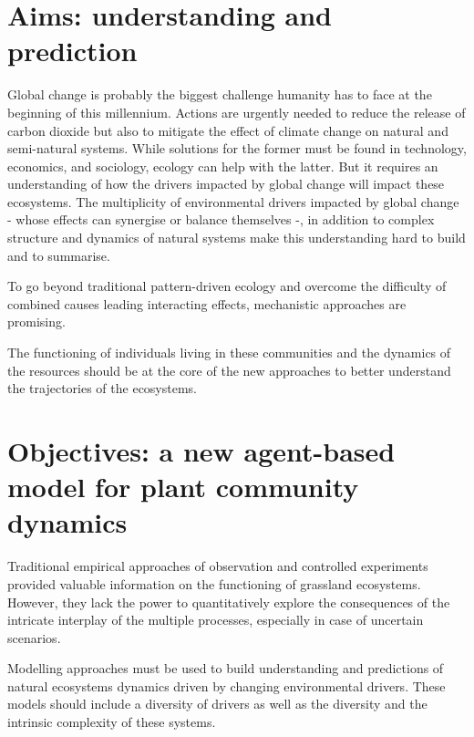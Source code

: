 \section{Aims: understanding and prediction}

Global change is probably the biggest challenge humanity has to face at the beginning of this millennium. Actions are urgently needed to reduce the release of carbon dioxide but also to mitigate the effect of climate change on natural and semi-natural systems. While solutions for the former must be found in technology, economics, and sociology, ecology can help with the latter. But it requires an understanding of how the drivers impacted by global change will impact these ecosystems. The multiplicity of environmental drivers impacted by global change - whose effects can synergise or balance themselves -, in addition to complex structure and dynamics of natural systems make this understanding hard to build and to summarise.

To go beyond traditional pattern-driven ecology and overcome the difficulty of combined causes leading interacting effects, mechanistic approaches are promising. 

The functioning of individuals living in these communities and the dynamics of the resources should be at the core of the new approaches to better understand the trajectories of the ecosystems.

%

\section{Objectives: a new agent-based model for plant community dynamics} %
Traditional empirical approaches of observation and controlled experiments provided valuable information on the functioning of grassland ecosystems. However, they lack the power to quantitatively explore the consequences of the intricate interplay of the multiple processes, especially in case of uncertain scenarios.

Modelling approaches must be used to build understanding and predictions of natural ecosystems dynamics driven by changing environmental drivers. These models should include a diversity of drivers as well as the diversity and the intrinsic complexity of these systems.

